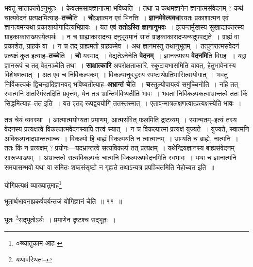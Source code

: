 \documentclass[article,12pt,a4paper]{memoir}
\begin{document}
	  \pstart भवतु साताकारोऽनुभूतः । केवलमसावज्ञानात्मा भविष्यति । तथा च कथमज्ञानेन ज्ञानात्मसंवेदनम् ? कथं चात्मवेदनं प्रत्यक्षमित्याह--\textbf{तच्चे}ति । \textbf{चो}ऽज्ञात्मन एवं भिनत्ति । \textbf{ज्ञानमेवेत्यवधा}रयतः प्रकाशात्मन एवं ज्ञानत्वमन्यथा प्रकाशायोगादित्यभिप्रायः । यत एवं \textbf{ततोऽस्ति ज्ञानानुभवः} । इत्यन्तर्मुखस्य सुखाद्याकारस्य ग्राहकाकाराख्यस्येत्यर्थः । न च ग्राह्याकारादन्य दनुभूयमानं सातं ग्राहकाकारादप्यन्यदुपपद्यते । ग्राह्यं वा प्रकाशेत, ग्राहकं वा । न च तद् ग्राह्यमतो ग्राहकमेव । अथ ज्ञानमस्तु तथानुभूतम् । तत्पुनरात्मसंवेदनं प्रत्यक्षं कुत इत्याह--\textbf{तच्चे}ति । \textbf{चो} यस्माद् । वेद्यतेऽनेनेति \textbf{वेदनम्} । ज्ञानरूपस्य \textbf{वेदनमि}ति विग्रहः\leavevmode{} । यद्वा ज्ञानरूपं च तद् वेदनञ्चेति तथा । \textbf{साक्षात्कारि} अपरोक्षताकारि, स्कुटावभासमिति यावत्, हेतुभावेनास्य विशेषणत्वात् । अत एव च निर्विकल्पकम् । विकल्पानुबद्धस्य स्पष्टार्थप्रतिभासित्वायोगात् । भवतु निर्विकल्पकं द्विचन्द्रादिज्ञानवद् भविष्यतीत्याह--\textbf{अभ्रान्तं चे}ति । \textbf{च}स्तुल्योपायत्वं समुच्चिनोति । नहि तत् स्वात्मनि अतस्मिंस्तदिति प्रवृत्तम्, येन तत्र भ्रान्तिर्भविष्यतीति भावः । भवतां निर्विकल्पकत्वाभ्रान्तत्वे ततः किं सिद्धमित्याह--तत इति । यत एतद् रूपद्वययोगि ततस्तस्मात् । एतावन्मात्रलक्षणत्वात्प्रत्यक्षस्येति भावः ।
	\pend
      

	  \pstart तत्र चेयं व्यवस्था । आत्मात्मयोग्यता प्रमाणम्, आत्मसंवित् फलमिति द्रष्टव्यम् । स्यान्मतम्--इत्यं तस्य वेदनस्य प्रत्यक्षत्वे विकल्पात्मवेदनस्यापि तत्त्वं स्यात् । न च विकल्पात्मा प्रत्यक्षं युज्यते । युज्यते, स्वात्मनि अविकल्पनादभ्रान्तत्वाच्च । विकल्पो हि बाह्यं विकल्पयति न त्वात्मानम् । भ्राम्यति च ब्राह्ये, नात्मनि । ततः किं न प्रत्यक्षम् ? प्रयोगः—यदभ्रान्तत्वे सत्यविकल्पं तत् प्रत्यक्षम् । यथेन्द्रियज्ञानस्य बाह्यसंवेदनम् सारूप्याख्यम् । अभ्रान्तत्वे सत्यविकल्पकं चात्मनि विकल्परूपवेदनमिति स्वभावः । यथा च ज्ञानात्मनि समयासम्भवो यथा वा समितः शब्दसंसृष्टो न गृह्यते तथाऽन्यत्र प्रपञ्चितमिति नेहोच्यत इति ॥
	\pend
	  \bigskip
	  \begingroup
	

	  \pstart योगिप्रत्यक्षं व्याख्यातुमाह\footnote{०ख्यातुकाम आह \cite{dp-msC} \cite{dp-msD}}
	\pend
      
	  \endgroup
	
	  \bigskip
	  \begingroup
	

	  \pstart भूतार्थभावनाप्रकर्षपर्यन्तजं योगिज्ञानं चेति ॥ ११ ॥
	\pend
      
	  \endgroup
	

	  \pstart भूतः \footnote{यथावस्थितः--\cite{dp-msD-n}}\-सद्भूतोऽर्थः । प्रमाणेन दृष्टश्च सद्भूतः ।
	\pend
      
\end{document}
